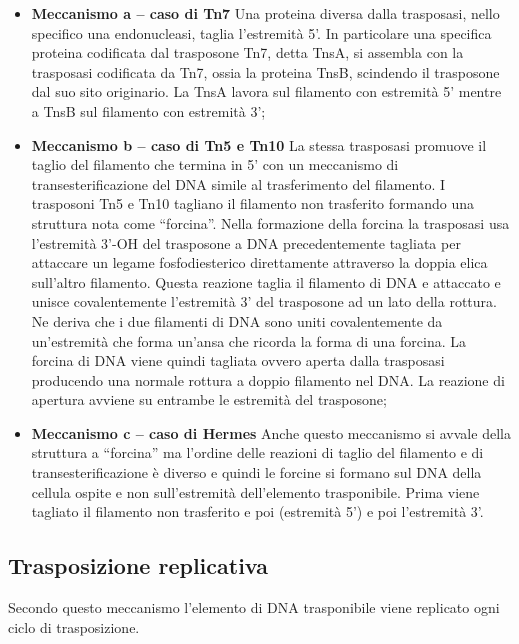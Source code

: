 \documentclass[11pt]{book}
\begin{document}
\begin{itemize}
\item
  \textbf{Meccanismo a -- caso di Tn7} Una proteina diversa dalla
  trasposasi, nello specifico una endonucleasi, taglia l'estremità 5'.
  In particolare una specifica proteina codificata dal trasposone Tn7,
  detta TnsA, si assembla con la trasposasi codificata da Tn7, ossia la
  proteina TnsB, scindendo il trasposone dal suo sito originario. La
  TnsA lavora sul filamento con estremità 5' mentre a TnsB sul filamento
  con estremità 3';
\item
  \textbf{Meccanismo b -- caso di Tn5 e Tn10} La stessa trasposasi
  promuove il taglio del filamento che termina in 5' con un meccanismo
  di transesterificazione del DNA simile al trasferimento del filamento.
  I trasposoni Tn5 e Tn10 tagliano il filamento non trasferito formando
  una struttura nota come ``forcina''. Nella formazione della forcina la
  trasposasi usa l'estremità 3'-OH del trasposone a DNA precedentemente
  tagliata per attaccare un legame fosfodiesterico direttamente
  attraverso la doppia elica sull'altro filamento. Questa reazione
  taglia il filamento di DNA e attaccato e unisce covalentemente
  l'estremità 3' del trasposone ad un lato della rottura. Ne deriva che
  i due filamenti di DNA sono uniti covalentemente da un'estremità che
  forma un'ansa che ricorda la forma di una forcina. La forcina di DNA
  viene quindi tagliata ovvero aperta dalla trasposasi producendo una
  normale rottura a doppio filamento nel DNA. La reazione di apertura
  avviene su entrambe le estremità del trasposone;
\item
  \textbf{Meccanismo c -- caso di Hermes} Anche questo meccanismo si
  avvale della struttura a ``forcina'' ma l'ordine delle reazioni di
  taglio del filamento e di transesterificazione è diverso e quindi le
  forcine si formano sul DNA della cellula ospite e non sull'estremità
  dell'elemento trasponibile. Prima viene tagliato il filamento non
  trasferito e poi (estremità 5') e poi l'estremità 3'.
\end{itemize}

\subsection{Trasposizione replicativa}
Secondo questo meccanismo l'elemento di DNA
trasponibile viene replicato ogni ciclo di trasposizione.
\end{document}
